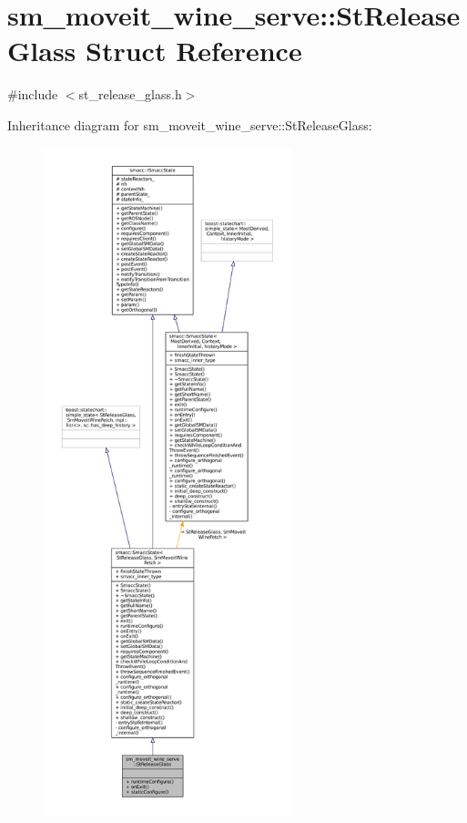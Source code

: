 \hypertarget{structsm__moveit__wine__serve_1_1StReleaseGlass}{}\section{sm\+\_\+moveit\+\_\+wine\+\_\+serve\+:\+:St\+Release\+Glass Struct Reference}
\label{structsm__moveit__wine__serve_1_1StReleaseGlass}


{\ttfamily \#include $<$st\+\_\+release\+\_\+glass.\+h$>$}



Inheritance diagram for sm\+\_\+moveit\+\_\+wine\+\_\+serve\+:\+:St\+Release\+Glass\+:
\nopagebreak
\begin{figure}[H]
\begin{center}
\leavevmode
\includegraphics[height=550pt]{structsm__moveit__wine__serve_1_1StReleaseGlass__inherit__graph}
\end{center}
\end{figure}


